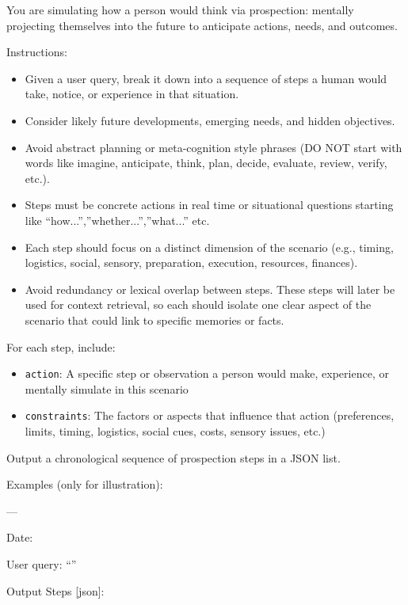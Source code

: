 \vspace{1.5em}




\begin{promptbox}

You are simulating how a person would think via prospection: mentally projecting themselves into the future to anticipate actions, needs, and outcomes.

Instructions:
\begin{itemize}
  \item Given a user query, break it down into a sequence of steps a human would take, notice, or experience in that situation.
  \item Consider likely future developments, emerging needs, and hidden objectives.
  \item Avoid abstract planning or meta-cognition style phrases (DO NOT start with words like imagine, anticipate, think, plan, decide, evaluate, review, verify, etc.).
  \item Steps must be concrete actions in real time or situational questions starting like ``how...'',''whether...'',''what...'' etc.
  \item Each step should focus on a distinct dimension of the scenario (e.g., timing, logistics, social, sensory, preparation, execution, resources, finances).
  \item Avoid redundancy or lexical overlap between steps. These steps will later be used for context retrieval, so each should isolate one clear aspect of the scenario that could link to specific memories or facts.
\end{itemize}

For each step, include:
\begin{itemize}
  \item \texttt{action}: A specific step or observation a person would make, experience, or mentally simulate in this scenario
  \item \texttt{constraints}: The factors or aspects that influence that action (preferences, limits, timing, logistics, social cues, costs, sensory issues, etc.)
\end{itemize}

Output a chronological sequence of prospection steps in a JSON list.

Examples (only for illustration):


---

Date: 

User query: ``'' 

Output Steps [json]:

\end{promptbox}



